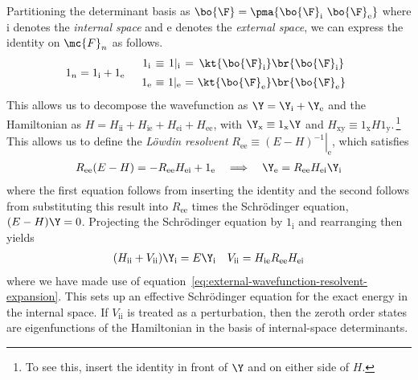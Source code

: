 \begin{rmk}
\label{rmk:lowdin-partitioning}
Partitioning the determinant basis as
$
  \bo{\F}
=
\pma{\bo{\F}_{\text{i}}\ \bo{\F}_{\text{e}}}
$
where $\text{i}$ denotes the \textit{internal space} and $\text{e}$ denotes the \textit{external space}, we can express the identity on $\mc{F}_n$ as follows.
\begin{align}
  1_n
=
  1_{\text{i}}
+
  1_{\text{e}}
&&
\begin{array}{c@{\ }c@{\ }c@{\ }c@{\ }c}
  1_{\text{i}}
&
\equiv
&
  1|_{\text{i}}
&
=
&
  \kt{\bo{\F}_{\text{i}}}
  \br{\bo{\F}_{\text{i}}}
\\[5pt]
  1_{\text{e}}
&
\equiv
&
  1|_{\text{e}}
&
=
&
  \kt{\bo{\F}_{\text{e}}}
  \br{\bo{\F}_{\text{e}}}
\end{array}
\end{align}
This allows us to decompose the wavefunction as
$
  \Y
=
  \Y_{\text{i}}
+
  \Y_{\text{e}}
$
and the Hamiltonian as
$
  H
=
  H_{\text{ii}}
+
  H_{\text{ie}}
+
  H_{\text{ei}}
+
  H_{\text{ee}}
$,
with
$
  \Y_{\text{x}}
\equiv
  1_{\text{x}}
  \Y
$
and
$
  H_{\text{xy}}
\equiv
  1_{\text{x}}
  H
  1_{\text{y}}
$.\,\footnote{To see this, insert the identity in front of $\Y$ and on either side of $H$.}
This allows us to define the
\textit{L\"owdin resolvent}
$
  R_{\text{ee}}
\equiv
  \left.
  (
    E
  -
    H
  )^{-1}
  \right|_{\text{e}}
$,
which satisfies
\begin{align}
\label{eq:external-wavefunction-resolvent-expansion}
  R_{\text{ee}}
  (
    E
  -
    H
  )
=
-
  R_{\text{ee}}
  H_{\text{ei}}
+
  1_{\text{e}}
&&
  \implies
&&
  \Y_{\text{e}}
=
  R_{\text{ee}}
  H_{\text{ei}}
  \Y_{\text{i}}
\end{align}
where the first equation follows from inserting the identity and the second follows from substituting this result into $R_{\text{ee}}$ times the Schr\"odinger equation,
$
  (
    E
  -
    H
  )
  \Y
=
  0
$.
Projecting the Schr\"odinger equation by $1_{\text{i}}$ and rearranging then yields
\begin{align}
  (
    H_{\text{ii}}
  +
    V_{\text{ii}}
  )
  \Y_{\text{i}}
=
  E
  \Y_{\text{i}}
&&
  V_{\text{ii}}
=
  H_{\text{ie}}
  R_{\text{ee}}
  H_{\text{ei}}
\end{align}
where we have made use of equation~\ref{eq:external-wavefunction-resolvent-expansion}.
This sets up an effective Schr\"odinger equation for the exact energy in the internal space.
If $V_{\text{ii}}$ is treated as a perturbation, then the zeroth order states are eigenfunctions of the Hamiltonian in the basis of internal-space determinants.

\end{rmk}
